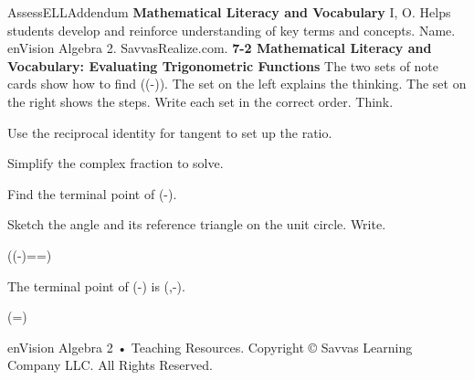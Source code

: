 \documentclass{article}
\newenvironment{te-addendum}[2]{}{}     %
\newcommand{\answer}[1]{}               %
\newcommand{\placeholder}[2]{}          %
\newcommand{\te}[1]{}                   %
\begin{document}
\begin{te-addendum}{Assess}{ELLAddendum}
\textbf{Mathematical Literacy and Vocabulary} I, O.
Helps students develop and reinforce understanding of key terms and concepts.
Name. enVision Algebra 2. SavvasRealize.com.
\textbf{7-2 Mathematical Literacy and Vocabulary: Evaluating Trigonometric Functions}
The two sets of note cards show how to find (\tan(-\frac{})). The set on the left explains the thinking. The set on the right shows the steps. Write each set in the correct order.
Think.
\item Use the reciprocal identity for tangent to set up the ratio.
\item Simplify the complex fraction to solve.
\item Find the terminal point of (-\frac{}).
\item Sketch the angle and its reference triangle on the unit circle.
Write.
\placeholder{graph}{Black unit circle centered O on x/y axes with arrowheads and no numeric ticks; dashed terminal radius in Quadrant IV at -pi/6.}
\item ((-\frac{})==)
\item The terminal point of (-\frac{}) is (,-).
\item (=)
\answer{Think. First, sketch the angle and its reference triangle on the unit circle. Second, find the terminal point of (-\frac\pi6). Third, use the reciprocal identity for tangent to set up the ratio. Finally, simplify the complex fraction to solve.}
\answer{Write. 1. See graph. 2. The terminal point of (-\frac\pi6) is (\frac{\sqrt3}{2},-\frac12). 3. (\text{Tangent}(-\frac\pi6)=\frac{-\frac12}{\frac{\sqrt3}{2}}=\frac{-1}{\sqrt3}). 4. (\frac{-1}{\sqrt3}=\frac{-\sqrt3}{3}).}
\placeholder{graph}{Answer 1: magenta unit circle centered O, arrowed x/y axes and no numeric ticks, magenta dashed radius into Quadrant IV at -pi/6.}
\te{Printed ``reciprocal identity for tangent''; likely ``quotient identity for tangent''.}
enVision Algebra 2 • Teaching Resources. Copyright © Savvas Learning Company LLC. All Rights Reserved.
\end{te-addendum}
\end{document}
